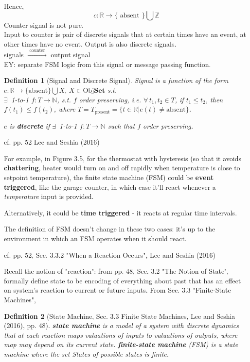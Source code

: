 \documentclass[10pt]{amsart}
\newtheorem{definition}{Definition}
\begin{document}
Hence, 
\[
c: \mathbb{R} \to \lbrace \text{ absent }\rbrace \bigcup \mathbb{Z}
	\]
	Counter signal is not pure. \\
	
	Input to counter is pair of discrete signals that at certain times have an event, at other times have no event. Output is also discrete signals. \\
	
	signals $\xrightarrow{ \text{ counter } }$ output signal \\
	
	EY: separate FSM logic from this signal or message passing function.


\begin{definition}[Signal and Discrete Signal]
	Signal is a function of the form $e : \mathbb{R} \to \lbrace \text{absent} \rbrace \bigcup X, \, X \in \text{Obj}{\mathbf{Set}}$ s.t. \\
	$\exists \,$ 1-to-1 $f: T \to \mathbb{N}$, s.t. $f$ order preserving, i.e. $\forall \, t_1, t_2 \in T$, if $t_1 \leq t_2$, then $f(t_1) \leq f(t_2)$, where $T = T_{\text{present}} = \lbrace t \in \mathbb{R} | e(t) \neq \text{absent} \rbrace$.

	$e$ is \textbf{discrete} if $\exists \,$ 1-to-1 $f:T\to \mathbb{N}$ such that $f$ order preserving.

\end{definition} 

cf. pp. 52 Lee and Seshia (2016) \cite{LeSe2016}

For example, in Figure 3.5, for the thermostat with hysteresis (so that it avoids \textbf{chattering}, heater would turn on and off rapidly when temperature is close to setpoint temperature), the finite state machine (FSM) could be \textbf{event triggered}, like the garage counter, in which case it'll react whenever a \emph{temperature} input is provided.

Alternatively, it could be \textbf{time triggered} - it reacts at regular time intervals.

The definition of FSM doesn't change in these two cases: it's up to the environment in which an FSM operates when it should react.

cf. pp. 52, Sec. 3.3.2 "When a Reaction Occurs", Lee and Seshia (2016) \cite{LeSe2016}

Recall the notion of "reaction": from pp. 48, Sec. 3.2 "The Notion of State", formally define state to be encoding of everything about past that has an effect on system's reaction to current or future inputs. From Sec. 3.3 "Finite-State Machines", 
\begin{definition}[State Machine, Sec. 3.3 Finite State Machines, Lee and Seshia (2016)\cite{LeSe2016}, pp. 48]
	\textbf{state machine} is a model of a system with discrete dynamics that at each \emph{reaction} maps valuations of inputs to valuations of outputs, where map may depend on its current state.
	\textbf{finite-state machine} (FSM) is a state machine where the set \emph{States} of possible states is finite.
\end{definition}
\end{document}

